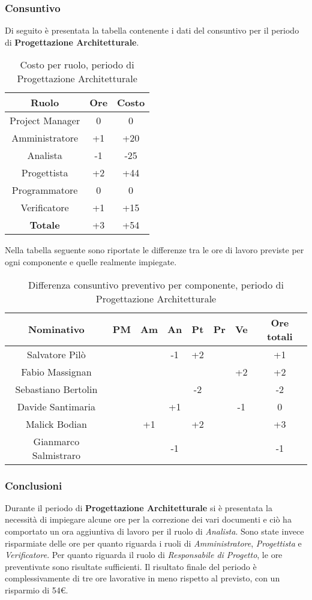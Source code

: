 		\subsubsection{Consuntivo}
		Di seguito è presentata la tabella contenente i dati del consuntivo per il periodo di \textbf{Progettazione Architetturale}.
	\begin{table}[H]
		\centering
		\begin{tabular}{|c|c|c|}
			\hline
			\textbf{Ruolo}		& \textbf{Ore}	& \textbf{Costo} \\
			\hline
			Project Manager		& 0			& 0	\\
			Amministratore		& +1		& +20 \\
			Analista			& -1		& -25 \\
			Progettista			& +2		& +44 \\
			Programmatore		& 0			& 0	\\
			Verificatore		& +1		& +15 \\
			\hline
			\textbf{Totale}		& +3		& +54 \\
			\hline
		\end{tabular}
		\caption{Costo per ruolo, periodo di Progettazione Architetturale}
	\end{table}
	Nella tabella seguente sono riportate le differenze tra le ore di lavoro previste per ogni componente e quelle realmente impiegate.
	\begin{table}[H]
		\centering
		\begin{tabular}{|c|c|c|c|c|c|c|c|}
			\hline
			\textbf{Nominativo}		& \textbf{PM}	& \textbf{Am}	& \textbf{An}	& \textbf{Pt}	& \textbf{Pr}	& \textbf{Ve}	& \textbf{Ore totali}     \\
			\hline
			Salvatore Pilò			& 		& 		& -1	& +2	&		&		& +1 \\
			Fabio Massignan			&		& 		&		&		&		& +2	& +2 \\
			Sebastiano Bertolin		&		& 	 	& 		& -2	&		&		& -2 \\
			Davide Santimaria		&		& 		& +1	&		&		& -1	& 0	 \\
			Malick Bodian			& 		& +1	& 		& +2	&		& 		& +3 \\
			Gianmarco Salmistraro	&		&		& -1 	&		&		& 		& -1 \\
			\hline
		\end{tabular}
		\caption{Differenza consuntivo preventivo per componente, periodo di Progettazione Architetturale}
	\end{table}
		\subsubsection{Conclusioni}
		Durante il periodo di \textbf{Progettazione Architetturale} si è presentata la necessità di impiegare alcune ore per la correzione dei vari documenti e ciò ha comportato un ora aggiuntiva di lavoro per il ruolo di \textit{Analista}. Sono state invece risparmiate delle ore per quanto riguarda i ruoli di \textit{Amministratore}, \textit{Progettista} e \textit{Verificatore}. Per quanto riguarda il ruolo di \textit{Responsabile di Progetto}, le ore preventivate sono risultate sufficienti. Il risultato finale del periodo è complessivamente di tre ore lavorative in meno rispetto al previsto, con un risparmio di 54€.
